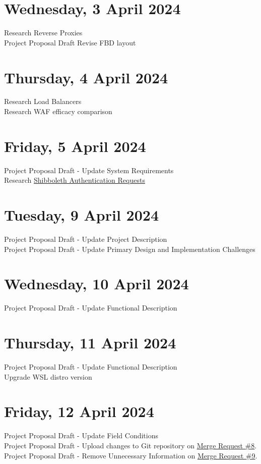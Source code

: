 \section[2024/04/03]{Wednesday, 3 April 2024}
Research Reverse Proxies\\
Project Proposal Draft Revise FBD layout\\
\pendsign

\section[2024/04/04]{Thursday, 4 April 2024}
Research Load Balancers\\
Research WAF efficacy comparison\\
\pendsign

\section[2024/04/05]{Friday, 5 April 2024}
Project Proposal Draft - Update System Requirements\\
Research \href{https://ieeexplore-ieee-org.uplib.idm.oclc.org/document/8478973/}{Shibboleth Authentication Requests}\\
\pendsign

\section[2024/04/09]{Tuesday, 9 April 2024}
Project Proposal Draft - Update Project Description\\
Project Proposal Draft - Update Primary Design and Implementation Challenges\\
\pendsign

\section[2024/04/10]{Wednesday, 10 April 2024}
Project Proposal Draft - Update Functional Description\\
\pendsign

\section[2024/04/11]{Thursday, 11 April 2024}
Project Proposal Draft - Update Functional Description\\
Upgrade WSL distro version
\pendsign

\section[2024/04/12]{Friday, 12 April 2024}
Project Proposal Draft - Update Field Conditions\\
Project Proposal Draft - Upload changes to Git repository on \href{https://repo.ee.up.ac.za/eece_ugfyp_tg/2024_isg/tg4-koot-u20426471/-/merge_requests/8}{Merge Request \#8}.\\
Project Proposal Draft - Remove Unnecessary Information on \href{https://repo.ee.up.ac.za/eece_ugfyp_tg/2024_isg/tg4-koot-u20426471/-/merge_requests/9}{Merge Request \#9}.\\
\pendsign

